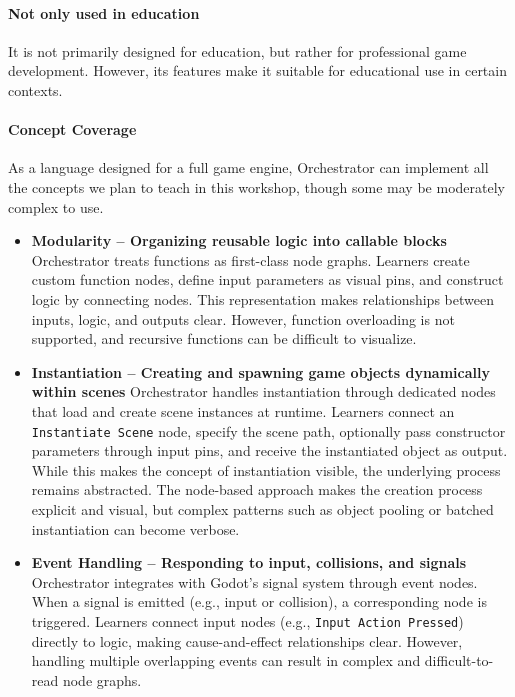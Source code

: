 \paragraph{Not only used in education}

It is not primarily designed for education, but rather for professional game development.
However, its features make it suitable for educational use in certain contexts.

\paragraph{Concept Coverage}
As a language designed for a full game engine, Orchestrator can implement all the concepts we plan to teach in this workshop, though some may be moderately complex to use.


\begin{itemize}

    \item \textbf{Modularity – Organizing reusable logic into callable blocks}
    Orchestrator treats functions as first-class node graphs.
    Learners create custom function nodes, define input parameters as visual pins, and construct logic by connecting nodes.
    This representation makes relationships between inputs, logic, and outputs clear.
    However, function overloading is not supported, and recursive functions can be difficult to visualize.
    \item \textbf{Instantiation – Creating and spawning game objects dynamically within scenes}
    Orchestrator handles instantiation through dedicated nodes that load and create scene instances at runtime.
    Learners connect an \texttt{Instantiate Scene} node, specify the scene path, optionally pass constructor parameters through input pins, and receive the instantiated object as output.
    While this makes the concept of instantiation visible, the underlying process remains abstracted.
    The node-based approach makes the creation process explicit and visual, but complex patterns such as object pooling or batched instantiation can become verbose.

    \item \textbf{Event Handling – Responding to input, collisions, and signals}
    Orchestrator integrates with Godot’s signal system through event nodes.
    When a signal is emitted (e.g., input or collision), a corresponding node is triggered.
    Learners connect input nodes (e.g., \texttt{Input Action Pressed}) directly to logic, making cause-and-effect relationships clear.
    However, handling multiple overlapping events can result in complex and difficult-to-read node graphs.


\end{itemize}
